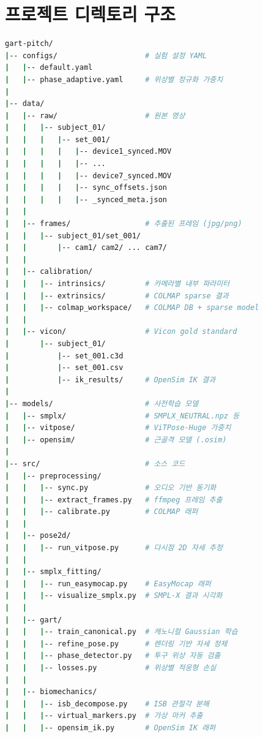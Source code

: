 \documentclass[11pt, a4paper]{report}
\begin{document}
\chapter{프로젝트 디렉토리 구조}
\label{ch:directory}

\begin{termbox}[title={권장 디렉토리 레이아웃}]
\begin{lstlisting}[language=bash, numbers=none]
gart-pitch/
|-- configs/                    # 실험 설정 YAML
|   |-- default.yaml
|   |-- phase_adaptive.yaml     # 위상별 정규화 가중치
|
|-- data/
|   |-- raw/                    # 원본 영상
|   |   |-- subject_01/
|   |   |   |-- set_001/
|   |   |   |   |-- device1_synced.MOV
|   |   |   |   |-- ...
|   |   |   |   |-- device7_synced.MOV
|   |   |   |   |-- sync_offsets.json
|   |   |   |   |-- _synced_meta.json
|   |
|   |-- frames/                 # 추출된 프레임 (jpg/png)
|   |   |-- subject_01/set_001/
|   |       |-- cam1/ cam2/ ... cam7/
|   |
|   |-- calibration/
|   |   |-- intrinsics/         # 카메라별 내부 파라미터
|   |   |-- extrinsics/         # COLMAP sparse 결과
|   |   |-- colmap_workspace/   # COLMAP DB + sparse model
|   |
|   |-- vicon/                  # Vicon gold standard
|       |-- subject_01/
|           |-- set_001.c3d
|           |-- set_001.csv
|           |-- ik_results/     # OpenSim IK 결과
|
|-- models/                     # 사전학습 모델
|   |-- smplx/                  # SMPLX_NEUTRAL.npz 등
|   |-- vitpose/                # ViTPose-Huge 가중치
|   |-- opensim/                # 근골격 모델 (.osim)
|
|-- src/                        # 소스 코드
|   |-- preprocessing/
|   |   |-- sync.py             # 오디오 기반 동기화
|   |   |-- extract_frames.py   # ffmpeg 프레임 추출
|   |   |-- calibrate.py        # COLMAP 래퍼
|   |
|   |-- pose2d/
|   |   |-- run_vitpose.py      # 다시점 2D 자세 추정
|   |
|   |-- smplx_fitting/
|   |   |-- run_easymocap.py    # EasyMocap 래퍼
|   |   |-- visualize_smplx.py  # SMPL-X 결과 시각화
|   |
|   |-- gart/
|   |   |-- train_canonical.py  # 캐노니컬 Gaussian 학습
|   |   |-- refine_pose.py      # 렌더링 기반 자세 정제
|   |   |-- phase_detector.py   # 투구 위상 자동 검출
|   |   |-- losses.py           # 위상별 적응형 손실
|   |
|   |-- biomechanics/
|   |   |-- isb_decompose.py    # ISB 관절각 분해
|   |   |-- virtual_markers.py  # 가상 마커 추출
|   |   |-- opensim_ik.py       # OpenSim IK 래퍼

\end{lstlisting}
\end{termbox}
\end{document}
